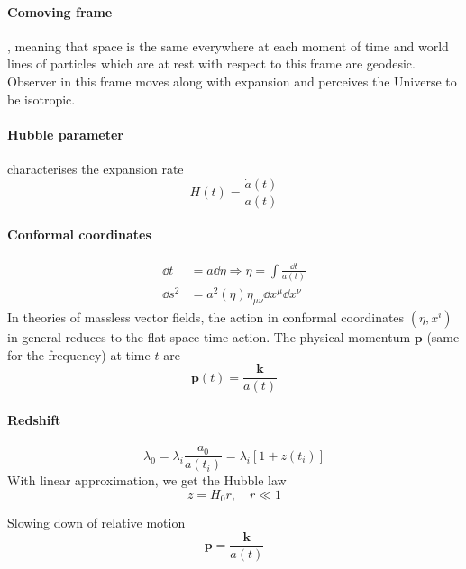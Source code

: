 \documentclass[12pt, a4paper, DIV=15]{article}
\numberwithin{equation}{section}
\begin{document}
\paragraph{Comoving frame}, meaning that space is the same everywhere at each moment of time and world lines of particles which are at rest with respect to this frame are geodesic. Observer in this frame moves along with expansion and perceives the Universe to be isotropic. 

\paragraph{Hubble parameter} characterises the expansion rate
\begin{equation}
   H(t) = \frac{\dot a(t)}{a(t)}
\end{equation}

\paragraph{Conformal coordinates}
\begin{align}
   \dd{t} &= a \dd{\eta} \Rightarrow \eta = \int \frac{\dd{t}}{a(t)}\\
   \dd{s^2} &= a^2(\eta) \eta_{\mu\nu} \dd{x^\mu} \dd{x^\nu}
\end{align}
In theories of massless vector fields, the action in conformal coordinates $(\eta, x^i)$ in general reduces to the flat space-time action. The physical momentum $\pmb{p}$ (same for the frequency) at time $t$ are
\begin{equation}
   \pmb{p} (t) = \frac{\pmb{k}}{a(t)}
\end{equation}

\paragraph{Redshift}
\begin{equation}
   \lambda_0 = \lambda_i \frac{a_0}{a(t_i)} = \lambda_i \left[  1 + z(t_i) \right]
\end{equation}
With linear approximation, we get the Hubble law
\begin{equation}
   z = H_0 r, \quad r \ll 1
\end{equation}

Slowing down of relative motion
\begin{equation}
   \pmb{p} = \frac{\pmb{k}}{a(t)}
\end{equation}
\end{document}
